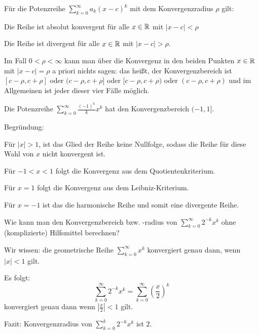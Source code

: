\begin{thm}
	Für die Potenzreihe $\sum_{k=0}^\infty a_k (x-c)^k$ mit dem Konvergenzradius $\rho$ gilt: 
	\begin{enuma}
		\item Die Reihe ist absolut konvergent für alle $x \in \mathbb{R}$ mit $|x-c| < \rho$
		\item Die Reihe ist divergent für alle $x \in \mathbb{R}$ mit $|x-c| > \rho$.
		\item Im Fall $0 < \rho < \infty$ kann man über die Konvergenz in den beiden Punkten $x \in \mathbb{R}$ mit $|x-c| = \rho$ a priori nichts sagen: das heißt, der Konvergenzbereich ist $[c-\rho,c+\rho]$ oder $(c-\rho,c+\rho]$ oder $[c-\rho,c+\rho)$ oder $(c-\rho,c+\rho)$ und im Allgemeinen ist jeder dieser vier Fälle möglich. 
	\end{enuma}
\end{thm} 

\begin{bsp} 
	Die Potenzreihe $\sum_{k=0}^\infty \frac{(-1)^k}{k} x^k$ hat den Konvergenzbereich $(-1,1]$.  
	
	Begründung: 
	\begin{enuma}
		\item Für $|x| > 1$, ist das Glied der Reihe keine Nullfolge, sodass die Reihe für diese Wahl von $x$ nicht konvergent ist. 
		\item Für $-1 < x < 1$ folgt die Konvergenz aus dem Quotientenkriterium. 
		\item Für $x=1$ folgt die Konvergenz aus dem Leibniz-Kriterium. 
		\item Für $x=-1$ ist das die harmonische Reihe und somit eine divergente Reihe. 
	\end{enuma} 
\end{bsp} 

\begin{bsp} 
	Wie kann man den Konvergenzbereich bzw. -radius von $\sum_{k=0}^\infty 2^{-k} x^k$ ohne (komplizierte) Hilfsmittel berechnen? 
	
	
	Wir wissen: die geometrische Reihe $\sum_{k=0}^\infty x^k$ konvergiert genau dann, wenn $|x| < 1$ gilt. 
	
	Es folgt: 
	\[
		\sum_{k=0}^\infty 2^{-k} x^k = \sum_{k=0}^\infty \left( \frac{x}{2}\right)^k
	\]
	konvergiert genau dann wenn $\left| \frac{x}{2} \right|  < 1$ gilt. 

	Fazit: Konvergenzradius von $\sum_{k=0}^k 2^{-k} x^k$ ist $2$. 
\end{bsp} 

